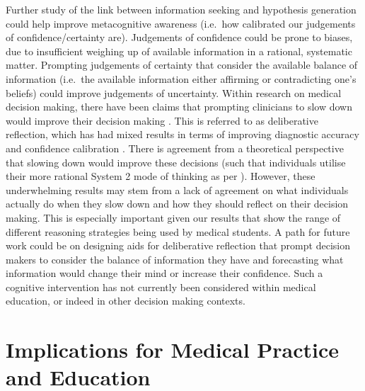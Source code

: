 \documentclass[a4paper, nobind]{templates/ociamthesis}
\begin{document}
Further study of the link between information seeking and hypothesis generation could help improve metacognitive awareness (i.e.~how calibrated our judgements of confidence/certainty are). Judgements of confidence could be prone to biases, due to insufficient weighing up of available information in a rational, systematic matter. Prompting judgements of certainty that consider the available balance of information (i.e.~the available information either affirming or contradicting one's beliefs) could improve judgements of uncertainty. Within research on medical decision making, there have been claims that prompting clinicians to slow down would improve their decision making \autocite{lambe_dual-process_2016}. This is referred to as deliberative reflection, which has had mixed results in terms of improving diagnostic accuracy and confidence calibration \autocite{mamede_effect_2010,lambe_guided_2018,costa_filho_effects_2019,kuhn_learning_2023}. There is agreement from a theoretical perspective that slowing down would improve these decisions (such that individuals utilise their more rational System 2 mode of thinking as per \textcite{kahneman_thinking_2011}). However, these underwhelming results may stem from a lack of agreement on what individuals actually do when they slow down and how they should reflect on their decision making. This is especially important given our results that show the range of different reasoning strategies being used by medical students. A path for future work could be on designing aids for deliberative reflection that prompt decision makers to consider the balance of information they have and forecasting what information would change their mind or increase their confidence. Such a cognitive intervention has not currently been considered within medical education, or indeed in other decision making contexts.

\section{Implications for Medical Practice and Education}\label{implications-for-medical-practice-and-education}
\end{document}
